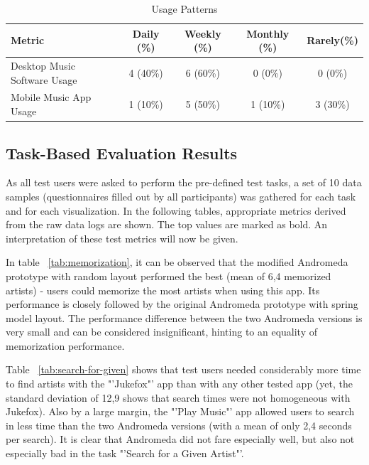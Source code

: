\begin{table}[H]
\begin{center}
\begin{tabular}{ | l | c | c | c | c |}
	\hline
	\textbf{Metric} & \textbf{Daily (\%)} & \textbf{Weekly (\%)} & \textbf{Monthly (\%)} & \textbf{Rarely(\%)}\\ \hline
	Desktop Music Software Usage & 4 (40\%) & 6 (60\%) & 0 (0\%) & 0 (0\%) \\ \hline
	Mobile Music App Usage & 1 (10\%) & 5 (50\%) & 1 (10\%) & 3 (30\%) \\ \hline
\end{tabular}
\caption {Usage Patterns} \label{tab:usage-patterns} 
\end{center}
\end{table}

\subsection{Task-Based Evaluation Results}
\label{sec:taskbased-evaluation-results}

As all test users were asked to perform the pre-defined test tasks, a set of 10 data samples (questionnaires filled out by all participants) was gathered for each task and for each visualization. In the following tables, appropriate metrics derived from the raw data logs are shown. The top values are marked as bold. An interpretation of these test metrics will now be given. 

In table ~\ref{tab:memorization}, it can be observed that the modified Andromeda prototype with random layout performed the best (mean of 6,4 memorized artists) - users could memorize the most artists when using this app. Its performance is closely followed by the original Andromeda prototype with spring model layout. The performance difference between the two Andromeda versions is very small and can be considered insignificant, hinting to an equality of memorization performance.

Table ~\ref{tab:search-for-given} shows that test users needed considerably more time to find artists with the  "'Jukefox"' app than with any other tested app (yet, the standard deviation of 12,9 shows that search times were not homogeneous with Jukefox). Also by a large margin, the "'Play Music"' app allowed users to search in less time than the two Andromeda versions (with a mean of only 2,4 seconds per search). It is clear that Andromeda did not fare especially well, but also not especially bad in the task "'Search for a Given Artist"'.


